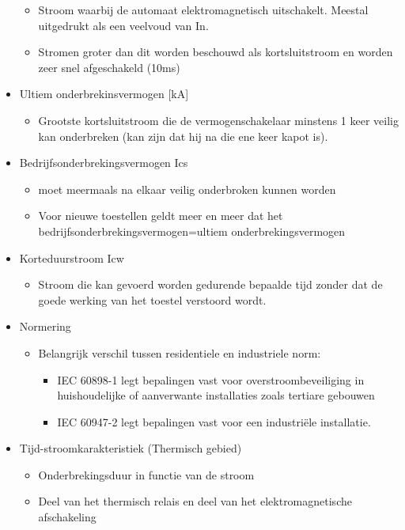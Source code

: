 \documentclass[12pt]{article}
\begin{document}
\begin{itemize}
\begin{itemize}
        \item Stroom waarbij de automaat elektromagnetisch uitschakelt. Meestal uitgedrukt als een veelvoud van In.
        \item Stromen groter dan dit worden beschouwd als kortsluitstroom en worden zeer snel afgeschakeld (10ms)
    \end{itemize}
    \item Ultiem onderbrekinsvermogen [kA]\begin{itemize}
        \item Grootste kortsluitstroom die de vermogenschakelaar minstens 1 keer veilig kan onderbreken (kan zijn dat hij na die ene keer kapot is).
    \end{itemize}
    \item Bedrijfsonderbrekingsvermogen Ics\begin{itemize}
        \item moet meermaals na elkaar veilig onderbroken kunnen worden
        \item Voor nieuwe toestellen geldt meer en meer dat het bedrijfsonderbrekingsvermogen=ultiem onderbrekingsvermogen
    \end{itemize}
    \item Korteduurstroom Icw\begin{itemize}
        \item Stroom die kan gevoerd worden gedurende bepaalde tijd zonder dat de goede werking van het toestel verstoord wordt.
    \end{itemize}
    \item Normering\begin{itemize}
        \item Belangrijk verschil tussen residentiele en industriele norm:\begin{itemize}
            \item IEC 60898-1 legt bepalingen vast voor overstroombeveiliging in huishoudelijke of aanverwante installaties zoals tertiare gebouwen
            \item IEC 60947-2 legt bepalingen vast voor een industriële installatie.
        \end{itemize}
    \end{itemize}
    \item Tijd-stroomkarakteristiek (Thermisch gebied)\begin{itemize}
        \item Onderbrekingsduur in functie van de stroom
        \item Deel van het thermisch relais en deel van het elektromagnetische afschakeling

\end{itemize}
\end{itemize}
\end{document}
